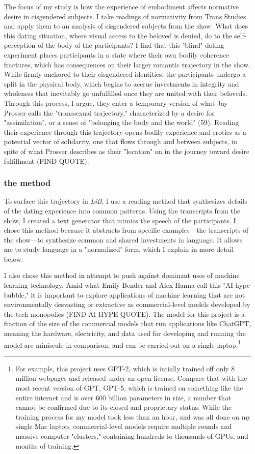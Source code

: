 \documentclass[11pt]{article}
\begin{document}
The focus of my study is how the experience of embodiment affects
normative desire in cisgendered subjects. I take readings of
normativity from Trans Studies and apply them to an analysis of
cisgendered subjects from the show. What does this dating situation,
where visual access to the beloved is denied, do to the
self-perception of the body of the participants? I find that this
"blind" dating experiment places participants in a state where their
own bodily coherence fractures, which has consequences on their larger
romantic trajectory in the show. While firmly anchored to their
cisgendered identities, the participants undergo a split in the
physical body, which begins to accrue investments in integrity and
wholeness that inevitably go unfulfilled once they are united with
their beloveds. Through this process, I argue, they enter a temporary
version of what Jay Prosser calls the "transsexual trajectory,"
characterized by a desire for "assimilation", or a sense of "belonging
the body and the world" (59). Reading their experience through this
trajectory opens bodily experience and erotics as a potential vector
of solidarity, one that flows through and between subjects, in spite
of what Prosser describes as their "location" on in the journey toward
desire fulfillment (FIND QUOTE). 

\subsubsection{the method}
\label{sec:org22d818b}
To surface this trajectory in \emph{LiB}, I use a reading method that
synthesizes details of the dating experience into common patterns.
Using the transcripts from the show, I created a text generator that
mimics the speech of the participants. I chose this method because it
abstracts from specific examples---the transcripts of the show---to
synthesize common and shared investments in language. It allows me to
study language in a "normalized" form, which I explain in more detail
below.

I also chose this method in attempt to push against dominant uses of
machine learning technology. Amid what Emily Bender and Alex Hanna
call this "AI hype bubble," it is important to explore applications of
machine learning that are not environmentally desvasting or extractive
as commercial-level models developed by the tech monopolies (FIND AI
HYPE QUOTE). The model for this project is a fraction of the size of
the commercial models that run applications like ChatGPT, meaning the
hardware, electricity, and data used for developing and running the
model are miniscule in comparison, and can be carried out on a single
laptop.\footnote{For example, this project uses GPT-2, which is intially trained
off only 8 million webpages and released under an open license.
Compare that with the most recent version of GPT, GPT-5, which is
trained on something like the entire internet and is over 600 billion
parameters in size, a number that cannot be confirmed due to its
closed and proprietary status. While the training process for my model
took less than an hour, and was all done on my single Mac laptop,
commercial-level models require multiple rounds and massive computer
"clusters," containing hundreds to thousands of GPUs, and months of
training.}
\end{document}
